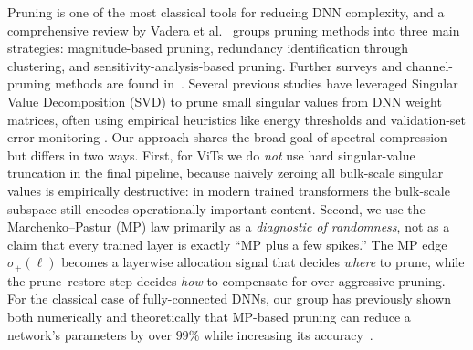\documentclass[11pt]{article}
\theoremstyle{plain}
\theoremstyle{definition}
\theoremstyle{remark}
\newcommand{\1}{\mathbf{1}}
\begin{document}
Pruning is one of the most classical tools for reducing DNN complexity, and a comprehensive review by Vadera et al.~\cite{vadera2022methods} groups pruning methods into three main strategies: magnitude-based pruning, redundancy identification through clustering, and sensitivity-analysis-based pruning.  Further surveys and channel-pruning methods are found in~\cite{cheng2023survey,khetan2020prunenet}.  Several previous studies have leveraged Singular Value Decomposition (SVD) to prune small singular values from DNN weight matrices, often using empirical heuristics like energy thresholds and validation-set error monitoring \cite{xue2013restructuring,cai2014fast,anhao2016svd,yang2020learning,xu2019trained}.  Our approach shares the broad goal of spectral compression but differs in two ways.  First, for ViTs we do \emph{not} use hard singular-value truncation in the final pipeline, because naively zeroing all bulk-scale singular values is empirically destructive: in modern trained transformers the bulk-scale subspace still encodes operationally important content.  Second, we use the Marchenko--Pastur (MP) law primarily as a \emph{diagnostic of randomness}, not as a claim that every trained layer is exactly ``MP plus a few spikes.''  The MP edge \(\sigma_+(\ell)\) becomes a layerwise allocation signal that decides \emph{where} to prune, while the prune--restore step decides \emph{how} to compensate for over-aggressive pruning.  For the classical case of fully-connected DNNs, our group has previously shown both numerically and theoretically that MP-based pruning can reduce a network's parameters by over \(99\%\) while increasing its accuracy~\cite{berlyand2023enhancing,shmalo2023deep}.
\end{document}
